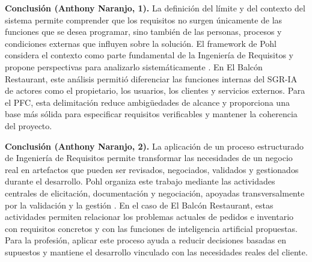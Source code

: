 \textbf{Conclusión (Anthony Naranjo, 1).}
La definición del límite y del contexto del sistema permite comprender que los requisitos no surgen únicamente de las funciones que se desea programar, sino también de las personas, procesos y condiciones externas que influyen sobre la solución. El framework de Pohl considera el contexto como parte fundamental de la Ingeniería de Requisitos y propone perspectivas para analizarlo sistemáticamente \cite{pohl2025}. En El Balcón Restaurant, este análisis permitió diferenciar las funciones internas del SGR-IA de actores como el propietario, los usuarios, los clientes y servicios externos. Para
el PFC, esta delimitación reduce ambigüedades de alcance y proporciona una base más sólida para especificar requisitos verificables y mantener la coherencia del proyecto.

\textbf{Conclusión (Anthony Naranjo, 2).}
La aplicación de un proceso estructurado de Ingeniería de Requisitos permite transformar las necesidades de un negocio real en artefactos que pueden ser revisados, negociados, validados y gestionados durante el desarrollo. Pohl
organiza este trabajo mediante las actividades centrales de elicitación, documentación y negociación, apoyadas transversalmente por la validación y la gestión \cite{pohl2025}. En el caso de El Balcón Restaurant, estas
actividades permiten relacionar los problemas actuales de pedidos e inventario con requisitos concretos y con las funciones de inteligencia artificial propuestas. Para la profesión, aplicar este proceso ayuda a reducir decisiones basadas en supuestos y mantiene el desarrollo vinculado con las necesidades reales del cliente.
